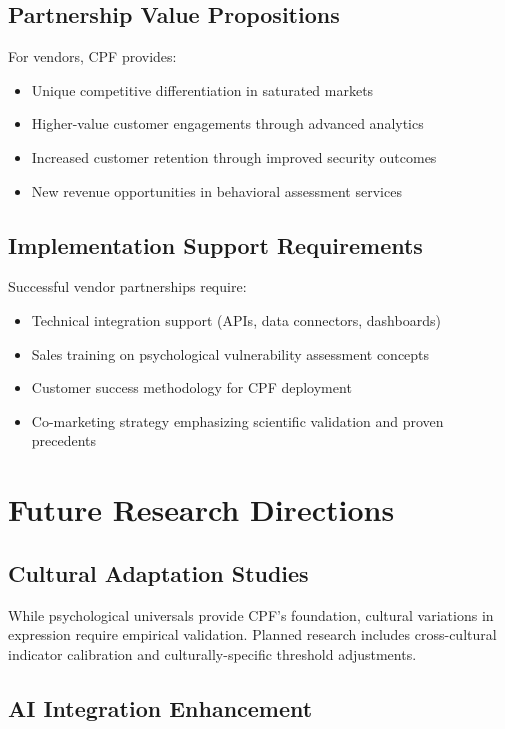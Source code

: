 \documentclass[11pt,a4paper]{article}
\begin{document}
\subsection{Partnership Value Propositions}

For vendors, CPF provides:
\begin{itemize}
\item Unique competitive differentiation in saturated markets
\item Higher-value customer engagements through advanced analytics
\item Increased customer retention through improved security outcomes
\item New revenue opportunities in behavioral assessment services
\end{itemize}

\subsection{Implementation Support Requirements}

Successful vendor partnerships require:
\begin{itemize}
\item Technical integration support (APIs, data connectors, dashboards)
\item Sales training on psychological vulnerability assessment concepts  
\item Customer success methodology for CPF deployment
\item Co-marketing strategy emphasizing scientific validation and proven precedents
\end{itemize}

\section{Future Research Directions}

\subsection{Cultural Adaptation Studies}

While psychological universals provide CPF's foundation, cultural variations in expression require empirical validation. Planned research includes cross-cultural indicator calibration and culturally-specific threshold adjustments.

\subsection{AI Integration Enhancement}
\end{document}
